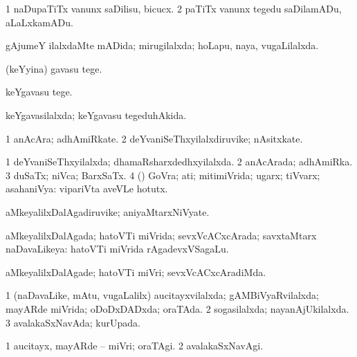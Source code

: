 \bentry
{} 
\gl{\sakirx}
\expl{}
\bmng
\bnum
\num{1} naDupaTiTx \mo vanunx saDilisu, bicucx. 
\num{2} paTiTx \mo vanunx tegedu saDilamADu, aLaLxkamADu. 
\enum
\emng
\eentry

\bentry
{} 
\gl{\gu}
\expl{}
\bmng
gAjumeY ilalxdaMte mADida; mirugilalxda; hoLapu, naya, \mo vugaLilalxda. 
\emng
\eentry

\bentry
{} 
\gl{\sakirx}
\expl{}
\bmng
 (keYyina) gavasu tege. 
\emng

\noindent
\gl{\akirx}
\expl{}
\bmng
keYgavasu tege. 
\emng
\eentry

\bentry
{} 
\gl{\gu}
\expl{}
\bmng
 keYgavasilalxda; keYgavasu tegeduhAkida. 
\emng
\eentry

\bentry
{} 
\gl{\nA}
\expl{}
\bmng
\bnum
\num{1} anAcAra; adhAmiRkate. 
\num{2} deYvaniSeThxyilalxdiruvike; nAsitxkate. 
\enum
\emng
\eentry

\bentry
{} 
\gl{\gu}
\bmng
\bnum
\num{1} deYvaniSeThxyilalxda; dhamaRsharxdedhxyilalxda. 
\num{2} anAcArada; adhAmiRka. 
\num{3} duSaTx; niVca; BarxSaTx. 
\num{4} (\AmA) GoVra; ati; mitimiVrida; ugarx; tiVvarx; asahaniVya:  vipariVta aveVLe hotutx. 
\enum
\emng
\eentry

\bentry
{} 
\gl{\nA}
\expl{}
\bmng
 aMkeyalilxDalAgadiruvike; aniyaMtarxNiVyate. 
\emng
\eentry

\bentry
{} 
\gl{\gu}
\expl{}
\bmng
aMkeyalilxDalAgada; hatoVTi miVrida; sevxVcACxcArada; savxtaMtarx naDavaLikeya:  hatoVTi miVrida rAgadevxVSagaLu. 
\emng
\eentry

\bentry
{} 
\gl{\kirxvi}
\expl{}
\bmng
aMkeyalilxDalAgade; hatoVTi miVri; sevxVcACxcAradiMda. 
\emng
\eentry

\bentry
{} 
\gl{\gu}
\expl{}
\bmng
\bnum
\num{1} (naDavaLike, mAtu, \mo vugaLalilx) aucitayxvilalxda; gAMBiVyaRvilalxda; mayARde miVrida; oDoDxDADxda; oraTAda. 
\num{2} sogasilalxda; nayanAjUkilalxda. 
\num{3} avalakaSxNavAda; kurUpada. 
\enum
\emng
\eentry

\bentry
{} 
\gl{\kirxvi}
\expl{}
\bmng
\bnum
\num{1} aucitayx, mayARde -- miVri; oraTAgi. 
\num{2} avalakaSxNavAgi. 
\enum
\emng
\eentry

